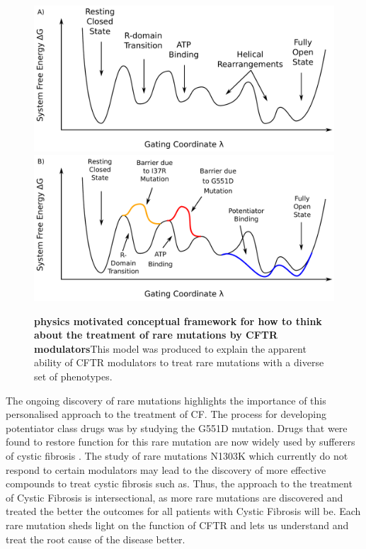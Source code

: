 \begin{figure}
	\label{drug_action_model}
	\begin{center}
	\includegraphics[width=\textwidth]{figures/drug_landscape_1.pdf}\\
	\includegraphics[width=\textwidth]{figures/drug_landscape_3.pdf}\\
	\end{center}
	\captionsetup{singlelinecheck = false, justification=raggedright}
	\caption[A physics motivated conceptual framework for how to think about the treatment of rare mutations by CFTR modulators ]{\textbf{physics motivated conceptual framework for how to think about the treatment of rare mutations by CFTR modulators}{This model was produced to explain the apparent ability of CFTR modulators to treat rare mutations with a diverse set of phenotypes. }}

\end{figure}

The ongoing discovery of rare mutations highlights the importance of this personalised approach to the treatment of CF. The process for developing potentiator class drugs was by studying the G551D mutation. Drugs that were found to restore function for this rare mutation are now widely used by sufferers of cystic fibrosis \cite{}. The study of rare mutations N1303K which currently do not respond to certain modulators may lead to the discovery of more effective compounds to treat cystic fibrosis such as. Thus, the approach to the treatment of Cystic Fibrosis is intersectional, as more rare mutations are discovered and treated the better the outcomes for all patients with Cystic Fibrosis will be. Each rare mutation sheds light on the function of CFTR and lets us understand and treat the root cause of the disease better.



